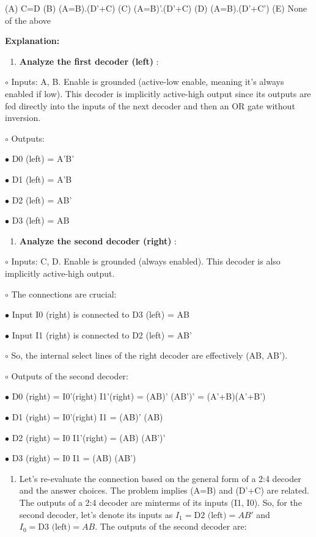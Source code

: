 \documentclass{article}
\begin{document}
\begin{itemize}
\begin{center}
\end{center}

(A) C=D (B) (A=B).(D'+C) (C) (A=B)'.(D'+C) (D) (A=B).(D'+C') (E) None of the above

\textbf{Explanation:}

\begin{enumerate}
\item \textbf{Analyze the first decoder (left)} :

\end{enumerate}
    $\circ$ Inputs: A, B. Enable is grounded (active-low enable, meaning it's always enabled if low). This decoder is implicitly active-high output since its outputs are fed directly into the inputs of the next decoder and then an OR gate without inversion.

    $\circ$ Outputs:

        $\bullet$ D0 (left) = A'B'

        $\bullet$ D1 (left) = A'B

        $\bullet$ D2 (left) = AB'

        $\bullet$ D3 (left) = AB

\begin{enumerate}
\item \textbf{Analyze the second decoder (right)} :

\end{enumerate}
    $\circ$ Inputs: C, D. Enable is grounded (always enabled). This decoder is also implicitly active-high output.

    $\circ$ The connections are crucial:

        $\bullet$ Input I0 (right) is connected to D3 (left) = AB

        $\bullet$ Input I1 (right) is connected to D2 (left) = AB'

    $\circ$ So, the internal select lines of the right decoder are effectively (AB, AB').

    $\circ$ Outputs of the second decoder:

        $\bullet$ D0 (right) = I0'(right) I1'(right) = (AB)' (AB')' = (A'+B)(A'+B')

        $\bullet$ D1 (right) = I0'(right) I1 = (AB)' (AB)

        $\bullet$ D2 (right) = I0 I1'(right) = (AB) (AB')'

        $\bullet$ D3 (right) = I0 I1 = (AB) (AB')

\begin{enumerate}
\item Let's re-evaluate the connection based on the general form of a 2:4 decoder and the answer choices. The problem implies (A=B) and (D'+C) are related. The outputs of a 2:4 decoder are minterms of its inputs (I1, I0). So, for the second decoder, let's denote its inputs as $I_1 = \text{D2 (left)} = AB'$ and $I_0 = \text{D3 (left)} = AB$. The outputs of the second decoder are:


\end{enumerate}
\end{itemize}
\end{document}
